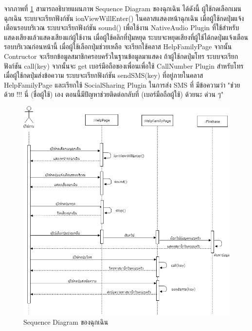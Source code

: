 	จากภาพที่ \ref{Fig:Sequence-danger} สามารถอธิบายแผนภาพ Sequence Diagram ของฉุกเฉิน ได้ดังนี้ 
	ผู้ใช้กดเลือกเมนฉุกเฉิน ระบบจะเรียกฟังก์ชัน ionViewWillEnter() ในคลาสแสดงหน้าฉุกเฉิน เมื่อผู้ใช้กดปุ่มแจ้งเตือนรอบบริเวณ ระบบจะเรียกฟังก์ชัน sound() เพื่อใช้งาน NativeAudio Plugin ที่ใช้สำหรับแสดงเสียงแล้วแสดงเสียงแก่ผู้ใช้งาน 
	เมื่อผู้ใช้คลิกที่ปุ่มหยุด ระบบจะหยุดเสียงที่ผู้ใช้ได้กดปุ่มแจ้งเตือนรอบบริเวณก่อนหน้านี้ เมื่อผู้ใช้เลือกปุ่มช่วยเหลือ จะเรียกใช้คลาส HelpFamilyPage จากนั้น Contructor จะเรียกข้อมูลสมาชิกครอบครัวในฐานข้อมูลมาแสดง 
	ถ้าผู้ใช้กดปุ่มโทร ระบบจะเรียกฟังก์ชัน call(key) จากนั้นจะ get เบอร์มือถือของเพื่อนเพื่อใช้ CallNumber Plugin สำหรับโทร เมื่อผู้ใช้กดปุ่มส่งข้อความ ระบบจะเรียกฟังก์ชัน sendSMS(key) ที่อยู่ภายในคลาส HelpFamilyPage และเรียกใช้ SocialSharing Plugin ในการส่ง SMS ที่
	มีข้อความว่า "ช่วยด้วย !!! นี่ (ชื่อผู้ใช้) เอง ตอนนี้มีปัญหาช่วยติดต่อกลับที่ (เบอร์มือถือผู้ใช้) ด้วยนะ ด่วน ๆ"
	\newpage
\begin{figure}[H]
	\centering
	\includegraphics[width=1.0\columnwidth]
	{Figures/3/Sequence/danger}
	\caption{Sequence Diagram ของฉุกเฉิน}
	\label{Fig:Sequence-danger}
\end{figure}

\newpage


	

